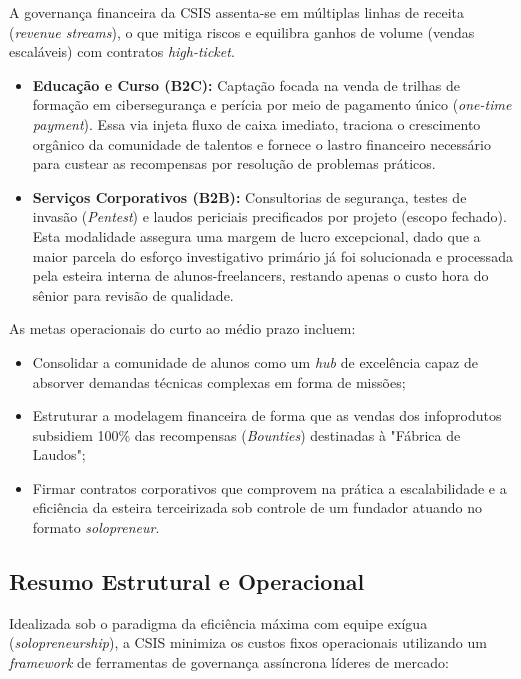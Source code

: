 \documentclass[../main.tex]{subfiles}
\begin{document}
A governança financeira da CSIS assenta-se em múltiplas linhas de receita (\textit{revenue streams}), o que mitiga riscos e equilibra ganhos de volume (vendas escaláveis) com contratos \textit{high-ticket}.

\begin{itemize}
  \item \textbf{Educação e Curso (B2C):} Captação focada na venda de trilhas de formação em cibersegurança e perícia por meio de pagamento único (\textit{one-time payment}). Essa via injeta fluxo de caixa imediato, traciona o crescimento orgânico da comunidade de talentos e fornece o lastro financeiro necessário para custear as recompensas por resolução de problemas práticos.
  \item \textbf{Serviços Corporativos (B2B):} Consultorias de segurança, testes de invasão (\textit{Pentest}) e laudos periciais precificados por projeto (escopo fechado). Esta modalidade assegura uma margem de lucro excepcional, dado que a maior parcela do esforço investigativo primário já foi solucionada e processada pela esteira interna de alunos-freelancers, restando apenas o custo hora do sênior para revisão de qualidade.
\end{itemize}

As metas operacionais do curto ao médio prazo incluem:
\begin{itemize}
  \item Consolidar a comunidade de alunos como um \textit{hub} de excelência capaz de absorver demandas técnicas complexas em forma de missões;
  \item Estruturar a modelagem financeira de forma que as vendas dos infoprodutos subsidiem 100\% das recompensas (\textit{Bounties}) destinadas à "Fábrica de Laudos";
  \item Firmar contratos corporativos que comprovem na prática a escalabilidade e a eficiência da esteira terceirizada sob controle de um fundador atuando no formato \textit{solopreneur}.
\end{itemize}

\subsection{Resumo Estrutural e Operacional}

Idealizada sob o paradigma da eficiência máxima com equipe exígua (\textit{solopreneurship}), a CSIS minimiza os custos fixos operacionais utilizando um \textit{framework} de ferramentas de governança assíncrona líderes de mercado:
\end{document}
